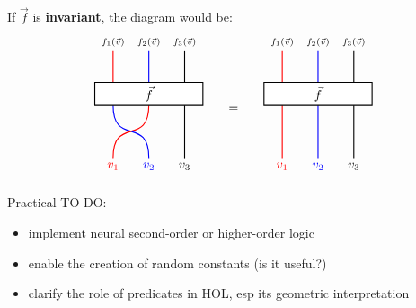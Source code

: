 If $\vec{f}$ is \textbf{invariant}, the diagram would be:
\begin{equation}
\begin{tikzpicture}[every path/.style={thick}]
\node[above] (x0) at (0, 3) {${\scriptstyle f_1(\vec{v})}$};
\node[above] (x1) at (1, 3) {${\scriptstyle f_2(\vec{v})}$};
\node[above] (x2) at (2, 3) {${\scriptstyle f_3(\vec{v})}$};
\node[] (z0) at (0, 1.5) {};
\node[] (z1) at (1, 1.5) {};
\node[] (z2) at (2, 1.5) {};
\node[red,below] (v0) at (0, 0) {$v_1$};
\node[blue,below] (v1) at (1, 0) {$v_2$};
\node[below] (v2) at (2, 0) {$v_3$};
\draw[red] (x0) to (z0.center);
\draw[blue] (x1) to (z1.center);
\draw (x2) to (z2.center);
\draw[blue] (z0.center) .. controls (0,0.3) and (1,1.2) .. (v1);
\draw[red] (z1.center) .. controls (1,0.3) and (0,1.2) .. (v0);
\draw (z2.center) to (v2);
\node[inner xsep=40pt,draw,in front of path,fill=white] (f) at (1,1.8) {$\vec{f}$};
\end{tikzpicture}
\qquad \raisebox{5em}{=} \qquad
\begin{tikzpicture}[every path/.style={thick}]
\node[above] (x0) at (0, 3) {${\scriptstyle f_1(\vec{v})}$};
\node[above] (x1) at (1, 3) {${\scriptstyle f_2(\vec{v})}$};
\node[above] (x2) at (2, 3) {${\scriptstyle f_3(\vec{v})}$};
\node[] (z0) at (0, 1.5) {};
\node[] (z1) at (1, 1.5) {};
\node[] (z2) at (2, 1.5) {};
\node[red,below] (v0) at (0, 0) {$v_1$};
\node[blue,below] (v1) at (1, 0) {$v_2$};
\node[below] (v2) at (2, 0) {$v_3$};
\draw[red] (x0) to (z0.center);
\draw[blue] (x1) to (z1.center);
\draw (x2) to (z2.center);
\draw[red] (z0.center) to (v0);
\draw[blue] (z1.center) to (v1);
\draw (z2.center) to (v2);
\node[inner xsep=40pt,draw,in front of path,fill=white] (f) at (1,1.8) {$\vec{f}$};
\end{tikzpicture}
\end{equation}

Practical TO-DO:
\begin{itemize}
	\item implement neural second-order or higher-order logic
	\item enable the creation of random constants (is it useful?)
	\item clarify the role of predicates in HOL, esp its geometric interpretation
\end{itemize}


